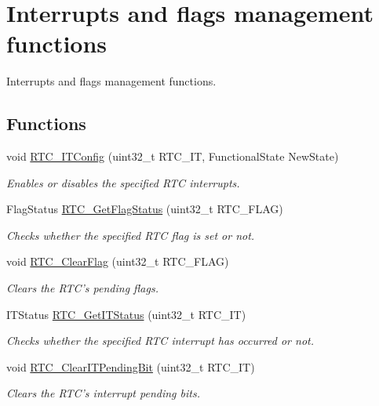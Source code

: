 \hypertarget{group___r_t_c___group13}{\section{Interrupts and flags management functions}
\label{group___r_t_c___group13}
}


Interrupts and flags management functions.  


\subsection*{Functions}
\begin{DoxyCompactItemize}
\item 
void \hyperlink{group___r_t_c___group13_gaa8469b33b3a99025baf52f007683b925}{R\-T\-C\-\_\-\-I\-T\-Config} (uint32\-\_\-t R\-T\-C\-\_\-\-I\-T, Functional\-State New\-State)
\begin{DoxyCompactList}\small\item\em Enables or disables the specified R\-T\-C interrupts. \end{DoxyCompactList}\item 
Flag\-Status \hyperlink{group___r_t_c___group13_gaf2a7f11aa7160e95650fd10845e7780b}{R\-T\-C\-\_\-\-Get\-Flag\-Status} (uint32\-\_\-t R\-T\-C\-\_\-\-F\-L\-A\-G)
\begin{DoxyCompactList}\small\item\em Checks whether the specified R\-T\-C flag is set or not. \end{DoxyCompactList}\item 
void \hyperlink{group___r_t_c___group13_ga9be3325e05418d05c8c5a5ad369c7d50}{R\-T\-C\-\_\-\-Clear\-Flag} (uint32\-\_\-t R\-T\-C\-\_\-\-F\-L\-A\-G)
\begin{DoxyCompactList}\small\item\em Clears the R\-T\-C's pending flags. \end{DoxyCompactList}\item 
I\-T\-Status \hyperlink{group___r_t_c___group13_gaab81adc6d2a5a5c1e37a49707c6bf640}{R\-T\-C\-\_\-\-Get\-I\-T\-Status} (uint32\-\_\-t R\-T\-C\-\_\-\-I\-T)
\begin{DoxyCompactList}\small\item\em Checks whether the specified R\-T\-C interrupt has occurred or not. \end{DoxyCompactList}\item 
void \hyperlink{group___r_t_c___group13_gacac6accc75ae54f1b799fa8e7e83ccdb}{R\-T\-C\-\_\-\-Clear\-I\-T\-Pending\-Bit} (uint32\-\_\-t R\-T\-C\-\_\-\-I\-T)
\begin{DoxyCompactList}\small\item\em Clears the R\-T\-C's interrupt pending bits. \end{DoxyCompactList}\end{DoxyCompactItemize}


